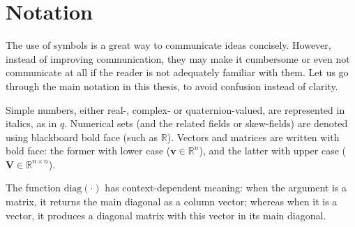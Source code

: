 

\section{Notation}
The use of symbols is a great way to communicate ideas concisely. However, instead of improving communication, they may make it cumbersome or even not communicate at all if the reader is not adequately familiar with them. Let us go through the main notation in this thesis, to avoid confusion instead of clarity.

Simple numbers, either real-, complex- or quaternion-valued, are represented in italics, as in $q$. Numerical sets (and the related fields or skew-fields) are denoted using blackboard bold face (such as $\mathbb{R}$). Vectors and matrices are written with bold face: the former with lower case ($\mathbf{v} \in \mathbb{R}^{n}$), and the latter with upper case ($\mathbf{V} \in \mathbb{R}^{n \times n}$).

The function $\mathrm{diag}(\cdot)$ has context-dependent meaning: when the argument is a matrix, it returns the main diagonal as a column vector; whereas when it is a vector, it produces a diagonal matrix with this vector in its main diagonal.


